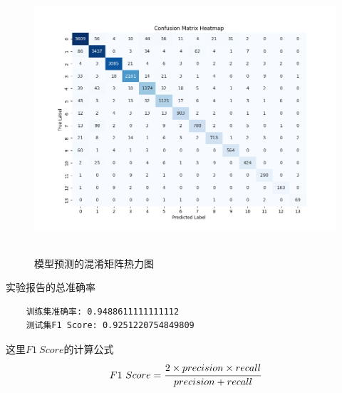\documentclass{article}
\begin{document}
 \begin{figure}[H]
    \centering
    \begin{minipage}[t]{1.0\linewidth}
        \centering
        \includegraphics[height=10cm]{Figure_2.png}
        \caption{模型预测的混淆矩阵热力图}
    \end{minipage}
 \end{figure}
 实验报告的总准确率
 \begin{verbatim}
    训练集准确率: 0.9488611111111112 
    测试集F1 Score: 0.9251220754849809
 \end{verbatim}
这里$F1\ Score$的计算公式
$$F1\ Score=\cfrac{2\times precision \times recall}{precision+recall}$$
\end{document}
